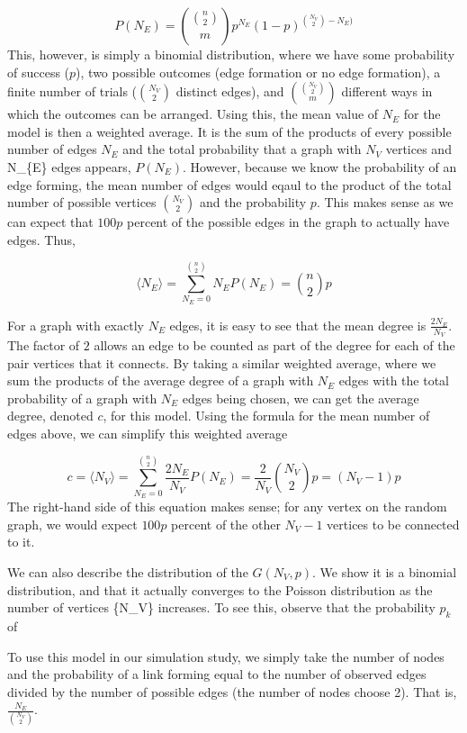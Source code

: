 \documentclass[12pt,twoside]{amherstthesis}
\begin{document}
  \[P(N_E) = {{n \choose 2} \choose m}p^{N_E}(1 - p)^{{N_V \choose 2} - N_E)}\]
  This, however, is simply a binomial distribution, where we have some
  probability of success (\(p\)), two possible outcomes (edge formation or
  no edge formation), a finite number of trials (\({N_{V} \choose 2}\)
  distinct edges), and \({{N_{V} \choose 2} \choose m}\) different ways in
  which the outcomes can be arranged. Using this, the mean value of
  \(N_E\) for the model is then a weighted average. It is the sum of the
  products of every possible number of edges \(N_E\) and the total
  probability that a graph with \(N_{V}\) vertices and N\_\{E\} edges
  appears, \(P(N_{E})\). However, because we know the probability of an
  edge forming, the mean number of edges would eqaul to the product of the
  total number of possible vertices \({N_{V} \choose 2}\) and the
  probability \(p\). This makes sense as we can expect that \(100p\)
  percent of the possible edges in the graph to actually have edges. Thus,
  
  \[ \langle N_{E} \rangle = \sum_{N_{E}=0}^{{n \choose 2}} N_{E}P(N_{E}) = {n \choose 2}p\]
  
  For a graph with exactly \(N_{E}\) edges, it is easy to see that the
  mean degree is \(\frac {2N_{E}} {N_{V}}\). The factor of \(2\) allows an
  edge to be counted as part of the degree for each of the pair vertices
  that it connects. By taking a similar weighted average, where we sum the
  products of the average degree of a graph with \(N_E\) edges with the
  total probability of a graph with \(N_E\) edges being chosen, we can get
  the average degree, denoted \(c\), for this model. Using the formula for
  the mean number of edges above, we can simplify this weighted average
  
  \[c = \langle N_{V} \rangle = \sum_{N_{E}=0}^{{n \choose 2}} \frac {2N_{E}} {N_{V}} P(N_{E}) = \frac {2} {N_{V}} {N_{V} \choose 2}p = (N_{V} - 1)p\]
  The right-hand side of this equation makes sense; for any vertex on the
  random graph, we would expect \(100p\) percent of the other
  \(N_{V} - 1\) vertices to be connected to it.
  
  We can also describe the distribution of the \(G(N_V, p)\). We show it
  is a binomial distribution, and that it actually converges to the
  Poisson distribution as the number of vertices \{N\_V\} increases. To
  see this, observe that the probability \(p_k\) of
  
  To use this model in our simulation study, we simply take the number of
  nodes and the probability of a link forming equal to the number of
  observed edges divided by the number of possible edges (the number of
  nodes choose 2). That is, \(\frac{N_{E}} {{N_{V} \choose 2}}\).
  
\end{document}

